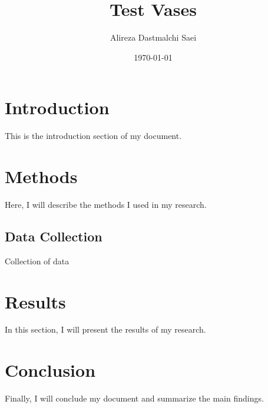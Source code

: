 \documentclass{article}
\begin{document}
\title{Test Vases}
\author{Alireza Dastmalchi Saei}
\date{\today}

\maketitle

\section{Introduction}

This is the introduction section of my document.

\section{Methods}

Here, I will describe the methods I used in my research.

\subsection{Data Collection}

Collection of data

\section{Results}

In this section, I will present the results of my research.

\section{Conclusion}

Finally, I will conclude my document and summarize the main findings.
\end{document}
